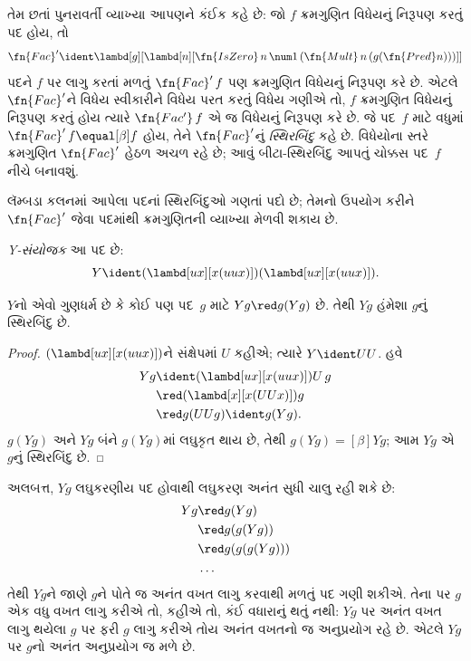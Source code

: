 તેમ છતાં પુનરાવર્તી વ્યાખ્યા આપણને કંઈક કહે છે: જો
$f$ ક્રમગુણિત વિધેયનું નિરૂપણ કરતું પદ હોય, તો
\[
\fn{Fac}' \ident \lambd[g][\lambd[n][\fn{IsZero} \, n \, \num 1\, (\fn{Mult} \, n\, (g (\fn{Pred} n)))]]
\]
પદને $f$ પર લાગુ કરતાં મળતું $\fn{Fac}'\,f$ પણ ક્રમગુણિત
વિધેયનું નિરૂપણ કરે છે. એટલે $\fn{Fac}'$ને વિધેય સ્વીકારીને
વિધેય પરત કરતું વિધેય ગણીએ તો, $f$ ક્રમગુણિત વિધેયનું
નિરૂપણ કરતું હોય ત્યારે $\fn{Fac'}\, f$ એ જ વિધેયનું
નિરૂપણ કરે છે. જે પદ~$f$ માટે વધુમાં $\fn{Fac}' \, f
\equal[\beta] f$ હોય, તેને $\fn{Fac}'$નું
\emph{સ્થિરબિંદુ} કહે છે. વિધેયોના સ્તરે ક્રમગુણિત
$\fn{Fac}'$ હેઠળ અચળ રહે છે; આવું બીટા-સ્થિરબિંદુ
આપતું ચોક્કસ પદ~$f$ નીચે બનાવશું.

લૅમ્બડા કલનમાં આપેલા પદનાં સ્થિરબિંદુઓ ગણતાં પદો છે;
તેમનો ઉપયોગ કરીને $\fn{Fac}'$ જેવા પદમાંથી ક્રમગુણિતની
વ્યાખ્યા મેળવી શકાય છે.

\begin{defn}
  \emph{Y-સંયોજક} આ પદ છે:
  \[
  Y \ident (\lambd[ux][x(uux)])(\lambd[ux][x(uux)]).
  \]
\end{defn}

\begin{thm}
  $Y$નો એવો ગુણધર્મ છે કે કોઈ પણ પદ~$g$ માટે
  $Yg \red g(Yg)$ છે. તેથી
  $Yg$ હંમેશા $g$નું સ્થિરબિંદુ છે.
\end{thm}

\begin{proof}
  $(\lambd[ux][x(uux)])$ને સંક્ષેપમાં $U$ કહીએ; ત્યારે
  $Y \ident UU$. હવે
  \begin{align*}
    Y g &\ident (\lambd[ux][x(uux)])U\,g \\
    &\red (\lambd[x][x(UUx)])g\\
    & \red g(UUg) \ident g(Yg).
  \end{align*}
  $g(Yg)$ અને $Yg$ બંને $g(Yg)$માં લઘુકૃત થાય છે,
  તેથી $g(Yg) \equal[\beta] Yg$; આમ $Yg$ એ $g$નું
  સ્થિરબિંદુ છે.
\end{proof}

અલબત્ત, $Yg$ લઘુકરણીય પદ હોવાથી લઘુકરણ અનંત સુધી
ચાલુ રહી શકે છે:
\begin{align*}
  Y g &\red g (Y g) \\
    &\red g (g (Y g)) \\
    &\red g(g (g (Y g)))\\
    &\ldots
\end{align*}
તેથી $Yg$ને જાણે $g$ને પોતે જ અનંત વખત લાગુ કરવાથી
મળતું પદ ગણી શકીએ. તેના પર $g$ એક વધુ વખત લાગુ
કરીએ તો, કહીએ તો, કંઈ વધારાનું થતું નથી: $Yg$ પર
અનંત વખત લાગુ થયેલા $g$ પર ફરી $g$ લાગુ કરીએ તોય
અનંત વખતનો જ અનુપ્રયોગ રહે છે. એટલે $Yg$ પર
$g$નો અનંત અનુપ્રયોગ જ મળે છે.

